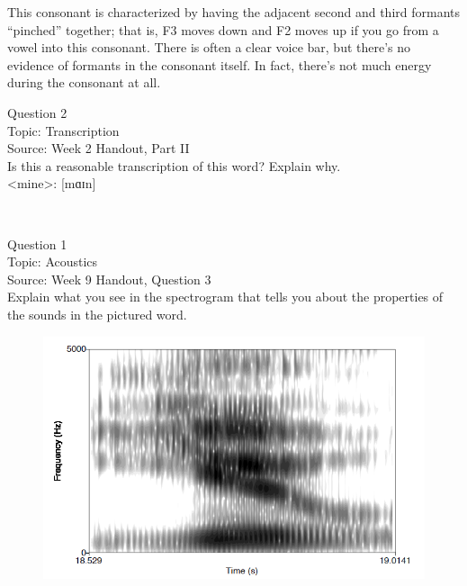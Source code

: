 \documentclass[12pt]{article}
\begin{document}
This consonant is characterized by having the adjacent second and third formants “pinched” together; that is, F3 moves down and F2 moves up if you go from a vowel into this consonant. There is often a clear voice bar, but there’s no evidence of formants in the consonant itself. In fact, there’s not much energy during the consonant at all.


\newpage

{\large Question 2}\\

Topic: Transcription\\
Source: Week 2 Handout, Part II\\

Is this a reasonable transcription of this word? Explain why.\\

<mine>: {[mɑɪn]}


\newpage

\begin{center}
\textbf{{\color{red}{\HUGE END OF EXAM}}}\\

\end{center}
\newpage

\begin{center}
\textbf{{\color{blue}{\HUGE START OF EXAM\\}}}

\textbf{{\color{blue}{\HUGE Student ID: 35405\\}}}

\textbf{{\color{blue}{\HUGE 9:40\\}}}

\end{center}
\newpage

{\large Question 1}\\

Topic: Acoustics\\
Source: Week 9 Handout, Question 3\\

Explain what you see in the spectrogram that tells you about the properties of the sounds in the pictured word.\\

\begin{figure}[H]
\includegraphics{../images/spectrogram_you.png}
\end{figure}
\end{document}
